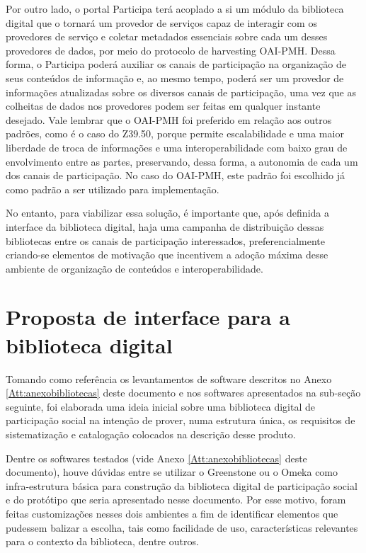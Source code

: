 Por outro lado, o portal Participa terá acoplado a si um módulo da biblioteca digital que o tornará um provedor de serviços capaz de interagir com os provedores de serviço e coletar metadados essenciais sobre cada um desses provedores de dados, por meio do protocolo de harvesting OAI-PMH. Dessa forma, o Participa poderá auxiliar os canais de participação na organização de seus conteúdos de informação e, ao mesmo tempo, poderá ser um provedor de informações atualizadas sobre os diversos canais de participação, uma vez que as colheitas de dados nos provedores podem ser feitas em qualquer instante desejado. Vale lembrar que o OAI-PMH foi preferido em relação aos outros padrões, como é o caso do Z39.50, porque permite escalabilidade e uma maior liberdade de troca de informações e uma interoperabilidade com baixo grau de envolvimento entre as partes, preservando, dessa forma, a autonomia de cada um dos canais de participação. No caso do OAI-PMH, este padrão foi escolhido já como padrão a ser utilizado para implementação. 

No entanto, para viabilizar essa solução, é importante que, após definida a interface da biblioteca digital, haja uma campanha de distribuição dessas bibliotecas entre os canais de participação interessados, preferencialmente criando-se elementos de motivação que incentivem a adoção máxima desse ambiente de organização de conteúdos e interoperabilidade.

\section{Proposta de interface para a biblioteca digital}
\label{sub:prototipo_biblioteca}

Tomando como referência os levantamentos de software descritos no Anexo \ref{Att:anexobibliotecas} deste documento e nos softwares apresentados na sub-seção seguinte, foi elaborada uma ideia inicial sobre uma biblioteca digital de participação social na intenção de prover, numa estrutura única, os requisitos de sistematização e catalogação colocados na descrição desse produto.
 
Dentre os softwares testados (vide Anexo \ref{Att:anexobibliotecas} deste documento), houve dúvidas entre se utilizar o Greenstone ou o Omeka como infra-estrutura básica para construção da biblioteca digital de participação social e do protótipo que seria apresentado nesse documento. Por esse motivo, foram feitas customizações nesses dois ambientes a fim de identificar elementos que pudessem balizar a escolha, tais como facilidade de uso, características relevantes para o contexto da biblioteca, dentre outros.

